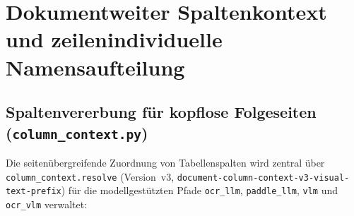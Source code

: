 \section{Dokumentweiter Spaltenkontext und zeilenindividuelle Namensaufteilung}
\label{sec:umsetzung-spalten-namen}

\subsection{Spaltenvererbung für kopflose Folgeseiten (\texttt{column\_context.py})}
\label{subsec:umsetzung-spaltenkontext}

Die seitenübergreifende Zuordnung von Tabellenspalten wird zentral über \texttt{column\_context.resolve} (Version~v3, \texttt{document-column-context-v3-visual-text-prefix}) für die modellgestützten Pfade \texttt{ocr\_llm}, \texttt{paddle\_llm}, \texttt{vlm} und \texttt{ocr\_vlm} verwaltet:

